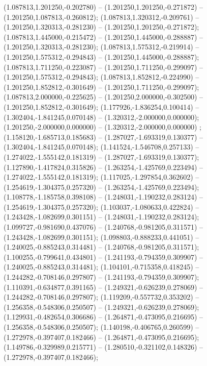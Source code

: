  (1.087813,1.201250,-0.202780) -- (1.201250,1.201250,-0.271872) -- (1.201250,1.087813,-0.260812);
 (1.087813,1.320312,-0.209761) -- (1.201250,1.320313,-0.281230) -- (1.201250,1.201250,-0.271872);
 (1.087813,1.445000,-0.215472) -- (1.201250,1.445000,-0.288887) -- (1.201250,1.320313,-0.281230);
 (1.087813,1.575312,-0.219914) -- (1.201250,1.575312,-0.294843) -- (1.201250,1.445000,-0.288887);
 (1.087813,1.711250,-0.223087) -- (1.201250,1.711250,-0.299097) -- (1.201250,1.575312,-0.294843);
 (1.087813,1.852812,-0.224990) -- (1.201250,1.852812,-0.301649) -- (1.201250,1.711250,-0.299097);
 (1.087813,2.000000,-0.225625) -- (1.201250,2.000000,-0.302500) -- (1.201250,1.852812,-0.301649);
 (1.177926,-1.836254,0.100414) -- (1.302404,-1.841245,0.070148) -- (1.320312,-2.000000,0.000000);
 (1.201250,-2.000000,0.000000) -- (1.320312,-2.000000,0.000000) ;
 (1.158120,-1.685713,0.185683) -- (1.287027,-1.693319,0.130377) -- (1.302404,-1.841245,0.070148);
 (1.141524,-1.546708,0.257133) -- (1.274022,-1.555142,0.181319) -- (1.287027,-1.693319,0.130377);
 (1.127890,-1.417824,0.315826) -- (1.263254,-1.425769,0.223494) -- (1.274022,-1.555142,0.181319);
 (1.117025,-1.297854,0.362602) -- (1.254619,-1.304375,0.257320) -- (1.263254,-1.425769,0.223494);
 (1.108778,-1.185758,0.398108) -- (1.248031,-1.190232,0.283124) -- (1.254619,-1.304375,0.257320);
 (1.103037,-1.080633,0.422824) -- (1.243428,-1.082699,0.301151) -- (1.248031,-1.190232,0.283124);
 (1.099727,-0.981690,0.437076) -- (1.240768,-0.981205,0.311571) -- (1.243428,-1.082699,0.301151);
 (1.098803,-0.888233,0.441051) -- (1.240025,-0.885243,0.314481) -- (1.240768,-0.981205,0.311571);
 (1.100255,-0.799641,0.434801) -- (1.241193,-0.794359,0.309907) -- (1.240025,-0.885243,0.314481);
 (1.104101,-0.715358,0.418245) -- (1.244282,-0.708146,0.297807) -- (1.241193,-0.794359,0.309907);
 (1.110391,-0.634877,0.391165) -- (1.249321,-0.626239,0.278069) -- (1.244282,-0.708146,0.297807);
 (1.119209,-0.557732,0.353202) -- (1.256358,-0.548306,0.250507) -- (1.249321,-0.626239,0.278069);
 (1.129931,-0.482654,0.306686) -- (1.264871,-0.473095,0.216695) -- (1.256358,-0.548306,0.250507);
 (1.140198,-0.406765,0.260599) -- (1.272978,-0.397407,0.182466) -- (1.264871,-0.473095,0.216695);
 (1.149786,-0.329989,0.215771) -- (1.280510,-0.321102,0.148326) -- (1.272978,-0.397407,0.182466);
